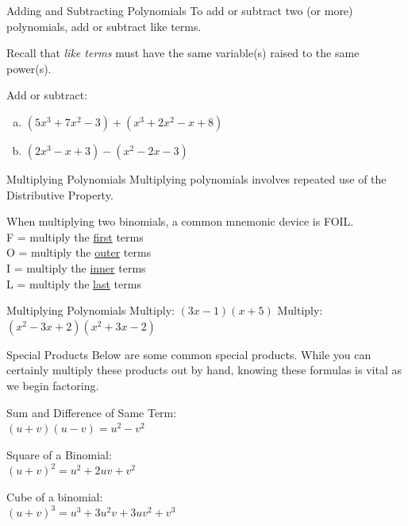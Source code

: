 \documentclass{beamer}
\newcommand{\fp}[1]{\left({#1}\right)} %
\begin{document}
\begin{frame}[t]{Adding and Subtracting Polynomials}
To add or subtract two (or more) polynomials, add or subtract like terms.

Recall that \textit{like terms} must have the same variable(s) raised to the same power(s).

\pause

Add or subtract: \begin{enumerate}[(a)]
\item $(5x^3 + 7x^2 - 3) + (x^3 + 2x^2 - x + 8)$
\item $(2x^3 - x + 3) - (x^2 - 2x - 3)$
\end{enumerate}
\end{frame}

\begin{frame}[t]{Multiplying Polynomials}
Multiplying polynomials involves repeated use of the Distributive Property.

When multiplying two binomials, a common mnemonic device is FOIL. \\
\pause F = multiply the \underline{first} terms \\
\pause O = multiply the \underline{outer} terms \\
\pause I = multiply the \underline{inner} terms \\
\pause L = multiply the \underline{last} terms
\end{frame}

\begin{frame}[t]{Multiplying Polynomials}
Multiply: $(3x-1)(x+5)$
\pause \vfill
Multiply: $\fp{x^2 - 3x + 2}\fp{x^2 + 3x - 2}$
\end{frame}

\begin{frame}[t]{Special Products}
Below are some common special products. While you can certainly multiply these products out by hand, knowing these formulas is vital as we begin factoring. \vspace{8pt}

\pause 

Sum and Difference of Same Term: \\ $(u+v)(u-v) = u^2 - v^2$ \vspace{8pt}

\pause

Square of a Binomial: \\ $(u + v)^2 = u^2 + 2uv + v^2$ \vspace{8pt}

\pause

Cube of a binomial: \\ $(u + v)^3 = u^3 + 3u^2v + 3uv^2 + v^3$
\end{frame}
\end{document}

